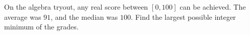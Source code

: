 On the algebra tryout, any real score between $[0,100]$ can be achieved. The average was $91$, and the median was $100$. Find the largest possible integer minimum of the grades.
